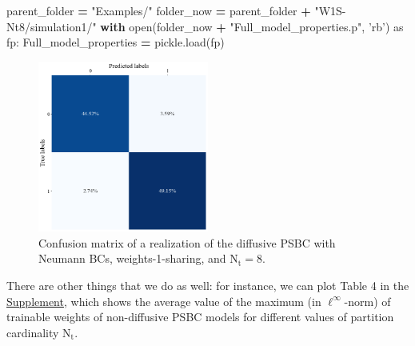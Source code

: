 \documentclass[openany,twoside]{book}
\newenvironment{Shaded}{\begin{snugshade}}{\end{snugshade}}
\newcommand{\BuiltInTok}[1]{#1}
\newcommand{\ControlFlowTok}[1]{\textcolor[rgb]{0.13,0.29,0.53}{\textbf{#1}}}
\newcommand{\ImportTok}[1]{#1}
\newcommand{\NormalTok}[1]{#1}
\newcommand{\OperatorTok}[1]{\textcolor[rgb]{0.81,0.36,0.00}{\textbf{#1}}}
\newcommand{\StringTok}[1]{\textcolor[rgb]{0.31,0.60,0.02}{#1}}
\begin{document}
\begin{Shaded}
\begin{Highlighting}[]
\NormalTok{parent_folder }\OperatorTok{=} \StringTok{"Examples/"}
\NormalTok{folder_now }\OperatorTok{=}\NormalTok{ parent_folder }\OperatorTok{+} \StringTok{"W1S-Nt8/simulation1/"}
\ControlFlowTok{with} \BuiltInTok{open}\NormalTok{(folder_now }\OperatorTok{+} \StringTok{"Full_model_properties.p"}\NormalTok{, }\StringTok{'rb'}\NormalTok{) }\ImportTok{as}\NormalTok{ fp:}
\NormalTok{	Full_model_properties }\OperatorTok{=}\NormalTok{ pickle.load(fp)}
\end{Highlighting}
\end{Shaded}

\begin{figure}[htbp]
\centering
\includegraphics[width=0.5\textwidth]{figures/output_80_0.png}
\caption{Confusion matrix of  a realization of the diffusive PSBC with Neumann BCs, weights-1-sharing, and $\mathrm{N_t = 8}$.}
\end{figure}

There are other things that we do as well: for instance, we can plot Table 4 in the \href{https://github.com/rafael-a-monteiro-math/Binary_classification_phase_separation/blob/master/Supplement.pdf}{Supplement}, which shows the average value of the maximum (in \(\ell^{\infty}\)-norm) of trainable weights of non-diffusive PSBC models for different values of partition cardinality \(\mathrm{N_t}\).
\end{document}
